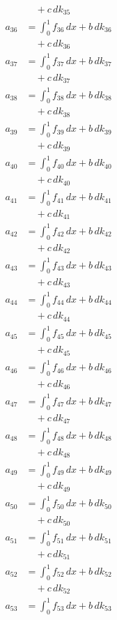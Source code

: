 \documentclass{article}
\begin{document}
\begin{align}
&\quad + c\,dk_{35} \\
a_{36} &= \int_0^1 f_{36}\,dx + b\,dk_{36} \\
&\quad + c\,dk_{36} \\
a_{37} &= \int_0^1 f_{37}\,dx + b\,dk_{37} \\
&\quad + c\,dk_{37} \\
a_{38} &= \int_0^1 f_{38}\,dx + b\,dk_{38} \\
&\quad + c\,dk_{38} \\
a_{39} &= \int_0^1 f_{39}\,dx + b\,dk_{39} \\
&\quad + c\,dk_{39} \\
a_{40} &= \int_0^1 f_{40}\,dx + b\,dk_{40} \\
&\quad + c\,dk_{40} \\
a_{41} &= \int_0^1 f_{41}\,dx + b\,dk_{41} \\
&\quad + c\,dk_{41} \\
a_{42} &= \int_0^1 f_{42}\,dx + b\,dk_{42} \\
&\quad + c\,dk_{42} \\
a_{43} &= \int_0^1 f_{43}\,dx + b\,dk_{43} \\
&\quad + c\,dk_{43} \\
a_{44} &= \int_0^1 f_{44}\,dx + b\,dk_{44} \\
&\quad + c\,dk_{44} \\
a_{45} &= \int_0^1 f_{45}\,dx + b\,dk_{45} \\
&\quad + c\,dk_{45} \\
a_{46} &= \int_0^1 f_{46}\,dx + b\,dk_{46} \\
&\quad + c\,dk_{46} \\
a_{47} &= \int_0^1 f_{47}\,dx + b\,dk_{47} \\
&\quad + c\,dk_{47} \\
a_{48} &= \int_0^1 f_{48}\,dx + b\,dk_{48} \\
&\quad + c\,dk_{48} \\
a_{49} &= \int_0^1 f_{49}\,dx + b\,dk_{49} \\
&\quad + c\,dk_{49} \\
a_{50} &= \int_0^1 f_{50}\,dx + b\,dk_{50} \\
&\quad + c\,dk_{50} \\
a_{51} &= \int_0^1 f_{51}\,dx + b\,dk_{51} \\
&\quad + c\,dk_{51} \\
a_{52} &= \int_0^1 f_{52}\,dx + b\,dk_{52} \\
&\quad + c\,dk_{52} \\
a_{53} &= \int_0^1 f_{53}\,dx + b\,dk_{53} \\

\end{align}
\end{document}
